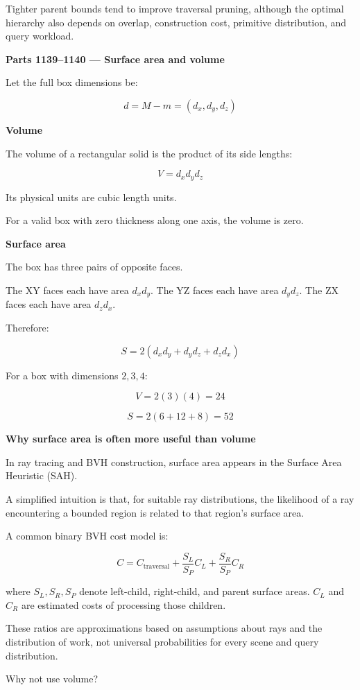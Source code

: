 Tighter parent bounds tend to improve traversal pruning, although the optimal hierarchy also depends on overlap, construction cost, primitive distribution, and query workload.

\textbf{Parts 1139--1140 --- Surface area and volume}

Let the full box dimensions be:

\[
d=M-m=(d_x,d_y,d_z)
\]

\textbf{Volume}

The volume of a rectangular solid is the product of its side lengths:

\[
\boxed{ V=d_xd_yd_z }
\]

Its physical units are cubic length units.

For a valid box with zero thickness along one axis, the volume is zero.

\textbf{Surface area}

The box has three pairs of opposite faces.

The XY faces each have area \(d_xd_y\). The YZ faces each have area \(d_yd_z\). The ZX faces each have area \(d_zd_x\).

Therefore:

\[
\boxed{ S=2(d_xd_y+d_yd_z+d_zd_x) }
\]

For a box with dimensions \(2,3,4\):

\[
V=2(3)(4)=24
\]

\[
S=2(6+12+8)=52
\]

\textbf{Why surface area is often more useful than volume}

In ray tracing and BVH construction, surface area appears in the Surface Area Heuristic (SAH).

A simplified intuition is that, for suitable ray distributions, the likelihood of a ray encountering a bounded region is related to that region's surface area.

A common binary BVH cost model is:

\[
C= C_{\mathrm{traversal}} + \frac{S_L}{S_P}C_L + \frac{S_R}{S_P}C_R
\]

where \(S_L,S_R,S_P\) denote left-child, right-child, and parent surface areas. \(C_L\) and \(C_R\) are estimated costs of processing those children.

These ratios are approximations based on assumptions about rays and the distribution of work, not universal probabilities for every scene and query distribution.

Why not use volume?

